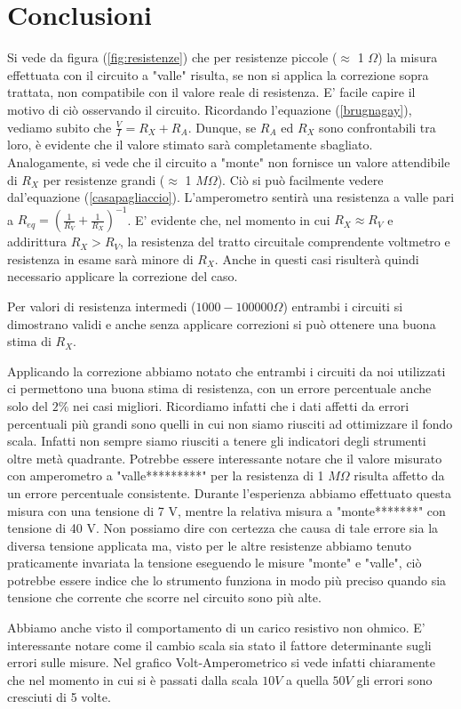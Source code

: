 \section{Conclusioni}
Si vede da figura (\ref{fig:resistenze}) che per resistenze piccole ($\approx$ 1 $\Omega$) la misura effettuata con il circuito a "valle" risulta, se non si applica la correzione sopra trattata, non compatibile con il valore reale di resistenza. E' facile capire il motivo di ciò osservando il circuito. Ricordando l'equazione (\ref{brugnagay}), vediamo subito che $\frac{V}{I}=R_X+R_A$. Dunque, se $R_A$ ed $R_X$ sono confrontabili tra loro, è evidente che il valore stimato sarà completamente sbagliato. Analogamente, si vede che il circuito a "monte" non fornisce un valore attendibile di $R_X$ per resistenze grandi ($\approx$ 1 $M\Omega$). Ciò si può facilmente vedere dal'equazione (\ref{casapagliaccio}). L'amperometro sentirà una resistenza a valle pari a $R_{eq}=(\frac{1}{R_V}+\frac{1}{R_X})^{-1}$. E' evidente che, nel momento in cui $R_X \approx R_V$ e addirittura $R_X > R_V$, la resistenza del tratto circuitale comprendente voltmetro e resistenza in esame sarà minore di $R_X$. Anche in questi casi risulterà quindi necessario applicare la correzione del caso. 

Per valori di resistenza intermedi ($1000-100000 \Omega$) entrambi i circuiti si dimostrano validi e anche senza applicare correzioni si può ottenere una buona stima di $R_X$.

Applicando la correzione abbiamo notato che entrambi i circuiti da noi utilizzati ci permettono una buona stima di resistenza, con un errore percentuale anche solo del $2\%$ nei casi migliori. Ricordiamo infatti che i dati affetti da errori percentuali più grandi sono quelli in cui non siamo riusciti ad ottimizzare il fondo scala. Infatti non sempre siamo riusciti a tenere gli indicatori degli strumenti oltre metà quadrante. Potrebbe essere interessante notare che il valore misurato con amperometro a "valle*********" per la resistenza di 1 $M \Omega$ risulta affetto da un errore percentuale consistente. Durante l'esperienza abbiamo effettuato questa misura con una tensione di 7 V, mentre la relativa misura a "monte*******" con tensione di 40 V. Non possiamo dire con certezza che causa di tale errore sia la diversa tensione applicata ma, visto per le altre resistenze abbiamo tenuto praticamente invariata la tensione eseguendo le misure "monte" e "valle", ciò potrebbe essere indice che lo strumento funziona in modo più preciso quando sia tensione che corrente che scorre nel circuito sono più alte. 


 Abbiamo anche visto il comportamento di un carico resistivo non ohmico. E' interessante notare come il cambio scala sia stato il fattore determinante sugli errori sulle misure. Nel grafico Volt-Amperometrico si vede infatti chiaramente che nel momento in cui si è passati dalla scala $10V$ a quella $50V$ gli errori sono cresciuti di 5 volte.